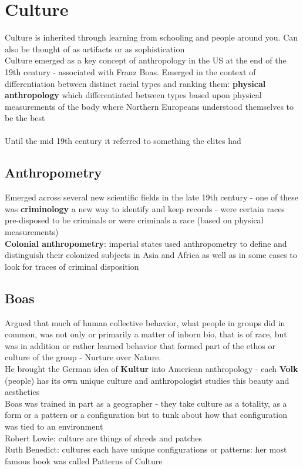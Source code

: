 \documentclass{article}
\begin{document}
\section{Culture}
Culture is inherited through learning from schooling and people around you. Can also be thought of as artifacts or as sophistication \\
Culture emerged as a key concept of anthropology in the US at the end of the 19th century - associated with Franz Boas. Emerged in the context of differentiation between distinct racial types and ranking them: \textbf{physical anthropology} which differentiated between types based upon physical measurements of the body where Northern Europeans understood themselves to be the best \\ \\
Until the mid 19th century it referred to something the elites had

\subsection{Anthropometry}
Emerged across several new scientific fields in the late 19th century - one of these was \textbf{criminology} a new way to identify and keep records - were certain races pre-disposed to be criminals or were criminals a race (based on physical measurements) \\
\textbf{Colonial anthropometry}: imperial states used anthropometry to define and distinguish their colonized subjects in Asia and Africa as well as in some cases to look for traces of criminal disposition

\subsection{Boas}
Argued that much of human collective behavior, what people in groups did in common, was not only or primarily a matter of inborn bio, that is of race, but was in addition or rather learned behavior that formed part of the ethos or culture of the group - Nurture over Nature. \\
He brought the German idea of \textbf{Kultur} into American anthropology - each \textbf{Volk} (people) has its own unique culture and anthropologist studies this beauty and aesthetics \\ 
Boas was trained in part as a geographer - they take culture as a totality, as a form or a pattern or a configuration but to tunk about how that configuration was tied to an environment \\
Robert Lowie: culture are things of shreds and patches \\
Ruth Benedict: cultures each have unique configurations or patterns: her most famous book was called Patterns of Culture
\end{document}
